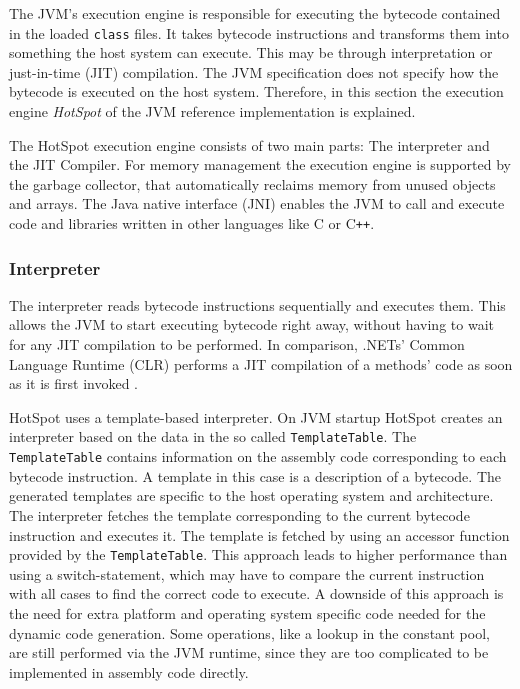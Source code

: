 The JVM's execution engine is responsible for executing the bytecode contained in the loaded \texttt{class} files. It takes bytecode instructions and transforms them into something the host system can execute. This may be through interpretation or just-in-time (JIT) compilation. The JVM specification does not specify how the bytecode is executed on the host system. Therefore, in this section the execution engine \textit{HotSpot} of the JVM reference implementation \textcite{OpenJDKHotspotRuntime} is explained.

The HotSpot execution engine consists of two main parts: The interpreter and the JIT Compiler. For memory management the execution engine is supported by the garbage collector, that automatically reclaims memory from unused objects and arrays. The Java native interface (JNI) enables the JVM to call and execute code and libraries written in other languages like C or C\verb|++|.

\subsubsection{Interpreter}

The interpreter reads bytecode instructions sequentially and executes them. This allows the JVM to start executing bytecode right away, without having to wait for any JIT compilation to be performed. In comparison, .NETs' Common Language Runtime (CLR) performs a JIT compilation of a methods' code as soon as it is first invoked \parencite{MicrosoftCILToNative}. 

HotSpot uses a template-based interpreter. On JVM startup HotSpot creates an interpreter based on the data in the so called \texttt{TemplateTable}. The \texttt{TemplateTable} contains information on the assembly code corresponding to each bytecode instruction. A template in this case is a description of a bytecode. The generated templates are specific to the host operating system and architecture. The interpreter fetches the template corresponding to the current bytecode instruction and executes it. The template is fetched by using an accessor function provided by the \texttt{TemplateTable}. This approach leads to higher performance than using a switch-statement, which may have to compare the current instruction with all cases to find the correct code to execute. A downside of this approach is the need for extra platform and operating system specific code needed for the dynamic code generation. Some operations, like a lookup in the constant pool, are still performed via the JVM runtime, since they are too complicated to be implemented in assembly code directly. 

